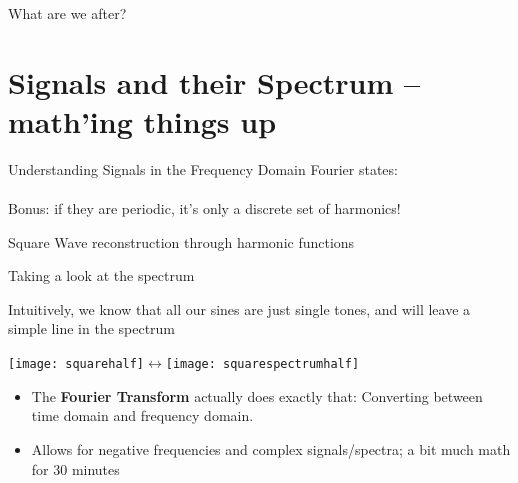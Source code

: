 \documentclass{beamer}
\begin{document}
\begin{frame}{What are we after?}

\end{frame}

\section{Signals and their Spectrum -- math'ing things up}
\begin{frame}{Understanding Signals in the Frequency Domain}
  Fourier states:\\[3em]

  \\[3em]

Bonus: if they are periodic, it's only a discrete set of harmonics!

\end{frame}

\begin{frame}{Square Wave reconstruction through harmonic functions}
  
\end{frame}

\begin{frame}{Taking a look at the spectrum}


Intuitively, we know that all our sines are just single tones, and will leave a simple line in the spectrum\bigskip

\texttt{[image: squarehalf]}$\leftrightarrow$\texttt{[image: squarespectrumhalf]}\bigskip

\pause

\begin{itemize}
  \item The \textbf{Fourier Transform} actually does exactly that: Converting between time domain and frequency domain.
  \item Allows for negative frequencies and complex signals/spectra; a bit much math for 30 minutes
\end{itemize}


\end{frame}
\end{document}
